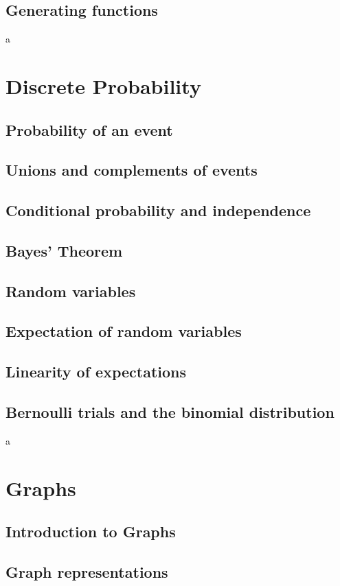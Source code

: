 \documentclass{article}
\begin{document}
\subsection{Generating functions}

a

\section{Discrete Probability}
\subsection{Probability of an event}
\subsection{Unions and complements of events}
\subsection{Conditional probability and independence}
\subsection{Bayes' Theorem}
\subsection{Random variables}
\subsection{Expectation of random variables}
\subsection{Linearity of expectations}
\subsection{Bernoulli trials and the binomial distribution}

a

\section{Graphs}
\subsection{Introduction to Graphs}
\subsection{Graph representations}
\end{document}
